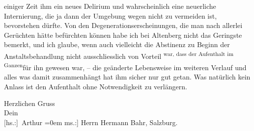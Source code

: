                einiger Zeit ihm ein neues Delirium und wahrscheinlich eine neuerliche Internierung,
               die ja dann der Umgebung wegen nicht zu vermeiden ist, bevorstehen dürfte. Von den
               Degenerationserscheinungen, die man nach allerlei Gerüchten hätte befürchten können
               habe ich bei Altenberg nicht das Geringste
               bemerkt, und ich glaube, wenn auch vielleicht die \label{T_L02129-1v}\label{T_L02129-1}
               Abstinenz zu Beginn der Anstaltsbehandlung nicht ausschliesslich von Vorteil \substVorne{}\textsuperscript{war, dass der Aufenthalt im Ganzen}\substDazwischen{}für ihn gewesen war\substHinten{}, – die geänderte Lebensweise im weiteren Verlauf und alles was damit
               zusammenhängt hat ihm sicher nur gut getan. Was natürlich kein Anlass ist den
               Aufenthalt ohne Notwendigkeit zu verlängern.\pend
           
\pstart
           Herzlichen Gruss{\\[\baselineskip]}Dein{\\[\baselineskip]}\spacefill\mbox{{[}hs.:{]} Arthur}\pend
           \leftskip=0em{}
\pstart
           \noindent{}{[}ms.:{]} Herrn Hermann Bahr, Salzburg.\pend
           \endnumbering{}  \newcommand{\dateiname}{L02129}\newcommand{\titel}{Arthur Schnitzler an Hermann Bahr, 22. 4. 1913}\newcommand{\editorInnen}{Herausgegeben von Martin Anton Müller}
